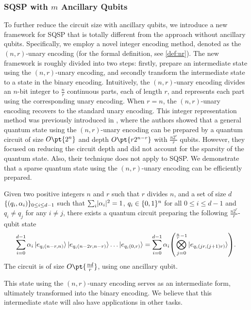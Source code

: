 \documentclass[a4paper,UKenglish,cleveref, autoref, thm-restate]{lipics-v2021}
\DeclarePairedDelimiter\rbra{\lparen}{\rparen}
\DeclarePairedDelimiter\cbra{\{}{\}}
\DeclarePairedDelimiter\abs{\lvert}{\rvert}
\newcommand{\bo}{O\pt}
\begin{document}
\subsubsection{\texorpdfstring{SQSP  with $m$ Ancillary Qubits}{SQSP  with m Ancillary Qubits}}
To further reduce the circuit size with ancillary qubits, we introduce a new framework for SQSP that is totally different from the approach without ancillary qubits. Specifically, we employ a novel integer encoding method, denoted as the $(n, r)$-unary encoding (for the formal definition, see \cref{def:nr}). The new framework is roughly divided into two steps: firstly, prepare an intermediate state using the $(n,r)$-unary encoding, and secondly transform the intermediate state to a state in the binary encoding. Intuitively, the $(n, r)$-unary encoding divides an $n$-bit integer to $\frac{n}{r}$ continuous parts, each of length $r$, and represents each part using the corresponding unary encoding. When $r = n$, the $(n, r)$-unary encoding recovers to the standard unary encoding. This integer representation method was previously introduced in \cite{johri2021nearest}, where the authors showed that a general quantum state using the $(n, r)$-unary encoding can be prepared by a quantum circuit of size $\bo{2^n}$ and depth $\bo{r2^{n-r}}$ with $\frac{n2^r}{r}$ qubits. However, they focused on reducing the circuit depth and did not account for the sparsity of the quantum state. Also, their technique does not apply to SQSP. We demonstrate that a sparse quantum state using the $(n, r)$-unary encoding can be efficiently prepared. 
\begin{lemma}\label{lemma:nr-encoding}
    Given two positive integers $n$ and $r$ such that $r$ divides $n$, and a set of size $d$ $\cbra{(q_i, \alpha_i)}_{0 \leq i \leq d-1}$ such that $\sum_i \abs{\alpha_i}^2 = 1$, $q_i \in \cbra{0, 1}^n$ for all $0 \leq i \leq d-1$ and $q_i \neq q_j$ for any $i \neq j$, there exists a quantum circuit preparing the following $\frac{n2^r}{r}$-qubit state
    \begin{align}
        \sum_{i=0}^{d-1} \alpha_i \ket{e_{q_i(n-r, n)}} \ket{e_{q_i(n-2r, n-r)}} \dots \ket{e_{q_i(0, r)}}
        = \sum_{i=0}^{d-1} \alpha_i \rbra*{\bigotimes_{j=0}^{\frac{n}{r}-1} \ket{e_{q_i(jr, (j+1)r)}}}.
    \end{align}
    The circuit is of size $\bo{\frac{nd}{r}}$, using one ancillary qubit.
\end{lemma}
This state using the $(n, r)$-unary encoding serves as an intermediate form, ultimately transformed into the binary encoding. We believe that this intermediate state will also have applications in other tasks.
\end{document}
